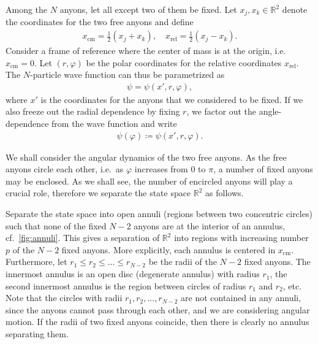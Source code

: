 \documentclass[a4paper,10pt,oneside]{book}
\theoremstyle{plain}
\theoremstyle{definition}
\theoremstyle{remark}
\begin{document}
Among the $N$ anyons, let all except two of them be fixed. Let $x_j, x_k \in \mathbb{R}^2$ denote the coordinates for the two free anyons and define
\begin{align*}
  x_\text{cm} = \frac{1}{2}(x_j + x_k), \quad
  x_\text{rel} = \frac{1}{2}(x_j - x_k).
\end{align*}
Consider a frame of reference where the center of mass is at the origin, i.e.\ $x_\text{cm} = 0$. Let $(r, \varphi)$ be the polar coordinates for the relative coordinates $x_\text{rel}$. The $N$-particle wave function can thus be parametrized as
\begin{align*}
  \psi = \psi(x', r, \varphi),
\end{align*}
where $x'$ is the coordinates for the anyons that we considered to be fixed. If we also freeze out the radial dependence by fixing $r$, we factor out the angle-dependence from the wave function and write
\begin{align*}
  \psi(\varphi) \coloneqq \psi(x', r, \varphi).
\end{align*}

We shall consider the angular dynamics of the two free anyons. As the free anyons circle each other, i.e.\ as $\varphi$ increases from $0$ to $π$, a number of fixed anyons may be enclosed. As we shall see, the number of encircled anyons will play a crucial role, therefore we separate the state space $\mathbb{R}^2$ as follows.

Separate the state space into open annuli (regions between two concentric circles) such that none of the fixed $N-2$ anyons are at the interior of an annulus, cf.\ \cref{fig:annuli}. This gives a separation of $\mathbb{R}^2$ into regions with increasing number $p$ of the $N-2$ fixed anyons. More explicitly, each annulus is centered in $x_\text{cm}$. Furthermore, let $r_1 \le r_2 \le \ldots \le r_{N-2}$ be the radii of the $N-2$ fixed anyons. The innermost annulus is an open disc (degenerate annulus) with radius $r_1$, the second innermost annulus is the region between circles of radius $r_1$ and $r_2$, etc. Note that the circles with radii $r_1, r_2, \ldots, r_{N-2}$ are not contained in any annuli, since the anyons cannot pass through each other, and we are considering angular motion. If the radii of two fixed anyons coincide, then there is clearly no annulus separating them.
\end{document}
